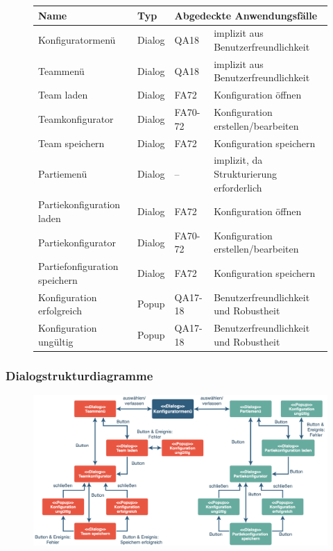 \begin{figure}[H]
    \centering
    \begin{tabular}{| l l l l |}
    \hline
    \textbf{Name} & \textbf{Typ} & \multicolumn{2}{l|}{\textbf{Abgedeckte Anwendungsfälle}} \\\hline
    Konfiguratormenü & Dialog & QA18 & implizit aus Benutzerfreundlichkeit\\\hline
    Teammenü & Dialog & QA18 & implizit aus Benutzerfreundlichkeit\\\hline
    Team laden & Dialog & FA72 & Konfiguration öffnen \\\hline
    Teamkonfigurator & Dialog & FA70-72 & Konfiguration erstellen/bearbeiten\\\hline
    Team speichern & Dialog & FA72 & Konfiguration speichern \\\hline
    Partiemenü & Dialog & – & implizit, da Strukturierung erforderlich\\\hline
    Partiekonfiguration laden & Dialog & FA72 & Konfiguration öffnen \\\hline
    Partiekonfigurator & Dialog & FA70-72 & Konfiguration erstellen/bearbeiten\\\hline
    Partiefonfiguration speichern & Dialog & FA72 & Konfiguration speichern \\\hline
    Konfiguration erfolgreich & Popup & QA17-18 & Benutzerfreundlichkeit und Robustheit\\\hline
    Konfiguration ungültig & Popup & QA17-18 & Benutzerfreundlichkeit und Robustheit\\\hline
    \end{tabular}
\end{figure}

\subsubsection{Dialogstrukturdiagramme}    
\begin{figure}[H]
    \centering
    \includegraphics[width=\textwidth]{images/dialogstruktur_konfigurator}
\end{figure}



